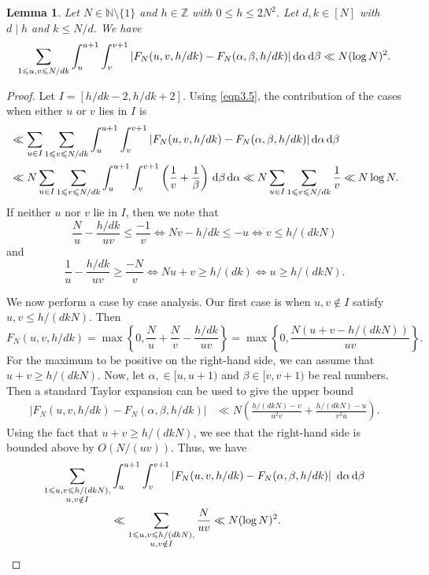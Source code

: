 \documentclass[12pt,reqno]{amsart}
\newtheorem{lemma}[theorem]{Lemma}
\theoremstyle{definition}
\theoremstyle{remark}
\numberwithin{equation}{section}
\renewcommand{\geq}{\geqslant}
\renewcommand{\leq}{\leqslant}
\def \N {\mathbb{N}}
\def \Z {\mathbb{Z}}
\def\d{{\,{\rm d}}}
\newcommand\1{\mathds{1}}
\begin{document}
\begin{lemma} \label{lem3.1}
    Let $N\in\N\setminus\{1\}$ and $h\in\Z$ with $0\leqslant h\leqslant 2N^2$. Let $d,k\in[N]$ with $d\mid h$ and $k\leqslant N/d$. We have
    \[  \sum_{1 \leq u,v \leq N/dk} \int_{u}^{u+1} \int_{v}^{v+1} |  F_N(u,v,h/dk) -   F_N(\alpha, \beta, h/dk) |  \d \alpha \d \beta   \ll N (\log N)^2.  \]
\end{lemma}

\begin{proof}
 Let $I = [h/dk - 2, h/dk + 2]$. Using \eqref{eqn3.5}, the contribution of the cases when either $u$ or $v$ lies in $I$ is
    \begin{align*} &  \ll  \sum_{u \in I} \sum_{1 \leq v \leq N/dk} \int_{u}^{u+1} \int_{v}^{v+1} |  F_N(u,v,h/dk) -   F_N(\alpha, \beta, h/dk) |  \d \alpha \d \beta \\
    & \ll N  \sum_{u \in I} \sum_{1 \leq v \leq N/dk}  \int_{u}^{u+1}  \int_{v}^{v+1} \left(\frac{1}{v} + \frac{1}{\beta} \right) \d \beta \d \alpha \ll  N  \sum_{u \in I} \sum_{1 \leq v \leq N/dk} \frac{1}{v}  \ll N \log N.
     \end{align*}
If neither $u$ nor $v$ lie in $I$, then we note that
\[\frac{N}{u} - \frac{h/dk}{uv} \leq \frac{ - 1}{v} \Leftrightarrow Nv  - h/dk \leq - u \Leftrightarrow v \leq h/(dkN) \]
and
\[  \frac{1}{u} - \frac{h/dk}{uv} \geq \frac{- N}{v}  \Leftrightarrow   Nu + v \geq h/(dk) \Leftrightarrow  u \geq h/(dkN)  .  \]

We now perform a case by case analysis. Our first case is when  $u, v \notin I$ satisfy $u,v \leq h/(dkN)$.  Then 
\[ F_N(u,v,h/dk) 
 = \max\left\{0, \frac{N}{u} + \frac{N}{v} - \frac{h/dk}{uv} \right\} = \max\left\{0, \frac{N(u+v - h/(dkN))}{uv} \right\}.\]
 For the maximum to be positive on the right-hand side, we can assume that $u + v \geq h/(dkN)$. Now, let $\alpha, \in [u,u+1)$ and $\beta \in [v, v+1)$ be real numbers. Then a standard Taylor expansion can be used to give the upper bound
\begin{align*}
|F_N(u,v,h/dk)  - F_N(\alpha, \beta, h/dk)| 
& \ll N \left(  \frac{h/(dkN)-v}{u^2 v}  + \frac{h/(dkN)-u}{v^2 u} \right) .
\end{align*}
Using the fact that $u+v \geq h/(dkN)$, we see that the right-hand side is bounded above by $O(N/(uv))$. Thus, we have
\begin{align*}
    \sum_{\substack{1 \leq u,v \leq h/(dkN), \\ u,v \notin I}} & \int_{u}^{u+1} \int_v^{v+1}| F_N(u,v, h/dk) -  F_N(\alpha,\beta,h/dk) | \  \d \alpha \d \beta \\
    & \ll  \sum_{\substack{1 \leq u,v \leq h/(dkN), \\ u,v \notin I}} \frac{N}{uv} \ll N (\log N)^2.
\end{align*}


\end{proof}
\end{document}
